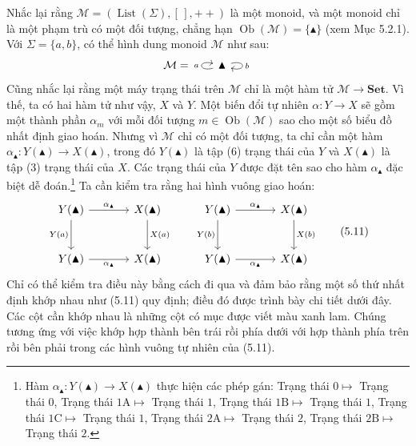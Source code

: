 Nhắc lại rằng $\mathcal M=(\operatorname{List}(\Sigma),[\,],\mathbin{+\!+})$ là một monoid, và một monoid chỉ là một phạm trù có một đối tượng, chẳng hạn $\operatorname{Ob}(\mathcal M)=\{\blacktriangle\}$ (xem Mục 5.2.1). Với $\Sigma=\{a,b\}$, có thể hình dung monoid $\mathcal M$ như sau:
\[\mathcal M=\begin{tikzcd}\blacktriangle\arrow[loop left,"a"]\arrow[loop right,"b"]\end{tikzcd}\]
Cũng nhắc lại rằng một máy trạng thái trên $\mathcal M$ chỉ là một hàm tử $\mathcal M\to\mathbf{Set}$. Vì thế, ta có hai hàm tử như vậy, $X$ và $Y$. Một biến đổi tự nhiên $\alpha:Y\to X$ sẽ gồm một thành phần $\alpha_m$ với mỗi đối tượng $m\in\operatorname{Ob}(\mathcal M)$ sao cho một số biểu đồ nhất định giao hoán. Nhưng vì $\mathcal M$ chỉ có một đối tượng, ta chỉ cần một hàm $\alpha_{\blacktriangle}:Y(\blacktriangle)\to X(\blacktriangle)$, trong đó $Y(\blacktriangle)$ là tập (6) trạng thái của $Y$ và $X(\blacktriangle)$ là tập (3) trạng thái của $X$.
Các trạng thái của $Y$ được đặt tên sao cho hàm $\alpha_{\blacktriangle}$ đặc biệt dễ đoán.\footnote{Hàm $\alpha_{\blacktriangle}:Y(\blacktriangle)\to X(\blacktriangle)$ thực hiện các phép gán: Trạng thái $0\mapsto$ Trạng thái $0$, Trạng thái $1\mathrm A\mapsto$ Trạng thái $1$, Trạng thái $1\mathrm B\mapsto$ Trạng thái $1$, Trạng thái $1\mathrm C\mapsto$ Trạng thái $1$, Trạng thái $2\mathrm A\mapsto$ Trạng thái $2$, Trạng thái $2\mathrm B\mapsto$ Trạng thái $2$.} Ta cần kiểm tra rằng hai hình vuông giao hoán:
\begin{equation*}\begin{tikzcd}[column sep=large,row sep=large]
Y(\blacktriangle)\arrow[r,"\alpha_{\blacktriangle}"]\arrow[d,"Y(a)"']&X(\blacktriangle)\arrow[d,"X(a)"]\\Y(\blacktriangle)\arrow[r,"\alpha_{\blacktriangle}"']&X(\blacktriangle)
\end{tikzcd}\qquad\begin{tikzcd}[column sep=large,row sep=large]
Y(\blacktriangle)\arrow[r,"\alpha_{\blacktriangle}"]\arrow[d,"Y(b)"']&X(\blacktriangle)\arrow[d,"X(b)"]\\Y(\blacktriangle)\arrow[r,"\alpha_{\blacktriangle}"']&X(\blacktriangle)
\end{tikzcd}\tag{5.11}\end{equation*}
Chỉ có thể kiểm tra điều này bằng cách đi qua và đảm bảo rằng một số thứ nhất định khớp nhau như (5.11) quy định; điều đó được trình bày chi tiết dưới đây. Các cột cần khớp nhau là những cột có mục được viết màu xanh lam. Chúng tương ứng với việc khớp hợp thành bên trái rồi phía dưới với hợp thành phía trên rồi bên phải trong các hình vuông tự nhiên của (5.11).
